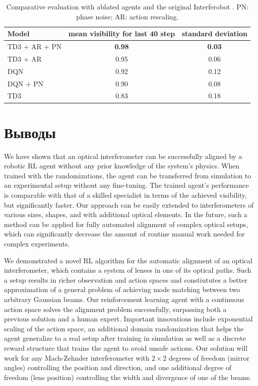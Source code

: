 \begin{table}[ht]
\centering
\begin{tabular}{|l |c| c|} 
 \hline
 Model & mean visibility for last 40 step & standard deviation \\
 \hline
 TD3 + AR + PN & \textbf{0.98} & \textbf{0.03} \\
\hline
TD3 + AR & 0.95 & 0.06\\
\hline
DQN  & 0.92 & 0.12\\
\hline
DQN + PN & 0.90 & 0.08\\
\hline
TD3& 0.83 & 0.18\\
\hline
\end{tabular}
\vskip 0.05in
\caption{Comparative evaluation with ablated agents and the original Interferobot \cite{sorokin2020interferobot}. PN: phase noise; AR: action rescaling.}
\label{table:1}
\end{table}

\section{Выводы}

We have shown that an optical interferometer can be successfully aligned by a robotic RL agent
without any prior knowledge of the system’s physics. When trained with the randomizations, the
agent can be transferred from simulation to an experimental setup without any fine-tuning. The
trained agent’s performance is comparable with that of a skilled specialist in terms of the achieved
visibility, but significantly faster. Our approach can be easily extended to interferometers of various
sizes, shapes, and with additional optical elements. In the future, such a method can be applied for
fully automated alignment of complex optical setups, which can significantly decrease the amount of
routine manual work needed for complex experiments.

We demonstrated a novel RL algorithm for the automatic alignment of an optical interferometer, which contains a system of lenses in one of its optical paths. Such a setup results in richer observation and action spaces and constiututes a better approximation of a general problem of achieving mode matching between two arbitrary Gaussian beams.  Our reinforcement learning agent with a continuous action space solves the alignment problem successfully, surpassing both a previous solution and a human expert. Important innovations include exponential scaling of the action space, an additional domain randomization that helps the agent generalize to a real setup after training in simulation as well as a discrete reward structure that trains the agent to avoid unsafe actions. Our solution will work for any Mach-Zehnder interferometer with $2\times2$ degrees of freedom (mirror angles) controlling the  position and direction, and one additional degree of freedom (lens position) controlling the width and divergence of one of the beams. %

